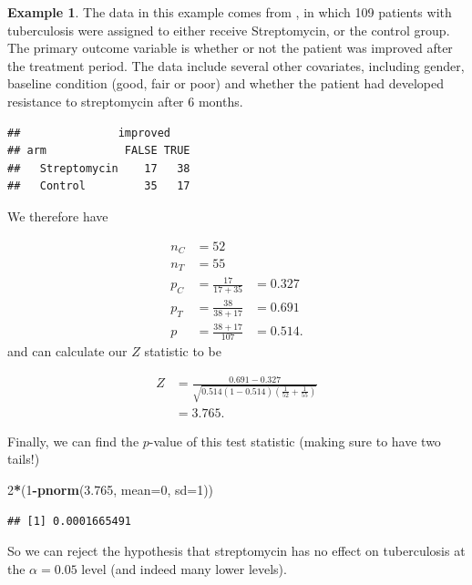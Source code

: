 \documentclass[
  openany]{book}
\newenvironment{Shaded}{\begin{snugshade}}{\end{snugshade}}
\newcommand{\AttributeTok}[1]{\textcolor[rgb]{0.13,0.29,0.53}{#1}}
\newcommand{\DecValTok}[1]{\textcolor[rgb]{0.00,0.00,0.81}{#1}}
\newcommand{\FloatTok}[1]{\textcolor[rgb]{0.00,0.00,0.81}{#1}}
\newcommand{\FunctionTok}[1]{\textcolor[rgb]{0.13,0.29,0.53}{\textbf{#1}}}
\newcommand{\NormalTok}[1]{#1}
\newcommand{\SpecialCharTok}[1]{\textcolor[rgb]{0.81,0.36,0.00}{\textbf{#1}}}
\theoremstyle{definition}
\theoremstyle{definition}
\newtheorem{example}{Example}[chapter]
\theoremstyle{definition}
\theoremstyle{definition}
\theoremstyle{remark}
\begin{document}
\begin{example}
The data in this example comes from \citet{strep_tb}, in which 109 patients with tuberculosis were assigned to either receive Streptomycin, or the control group. The primary outcome variable is whether or not the patient was improved after the treatment period. The data include several other covariates, including gender, baseline condition (good, fair or poor) and whether the patient had developed resistance to streptomycin after 6 months.

\begin{verbatim}
##               improved
## arm            FALSE TRUE
##   Streptomycin    17   38
##   Control         35   17
\end{verbatim}

We therefore have

\[
\begin{aligned}
n_C & = 52 \\
n_T & = 55 \\
p_C & = \frac{17}{17+35} & = 0.327\\
p_T & = \frac{38}{38+17} & = 0.691\\
p & = \frac{38+17}{107} &= 0.514. 
\end{aligned}
\]
and can calculate our \(Z\) statistic to be

\[
\begin{aligned}
Z & = \frac{0.691 - 0.327}{\sqrt{0.514\left(1-0.514\right)\left(\frac{1}{52} + \frac{1}{55}\right)}}\\
& = 3.765.
\end{aligned}
\]

Finally, we can find the \(p\)-value of this test statistic (making sure to have two tails!)

\begin{Shaded}
\begin{Highlighting}[]
\DecValTok{2}\SpecialCharTok{*}\NormalTok{(}\DecValTok{1}\SpecialCharTok{{-}}\FunctionTok{pnorm}\NormalTok{(}\FloatTok{3.765}\NormalTok{, }\AttributeTok{mean=}\DecValTok{0}\NormalTok{, }\AttributeTok{sd=}\DecValTok{1}\NormalTok{))}
\end{Highlighting}
\end{Shaded}

\begin{verbatim}
## [1] 0.0001665491
\end{verbatim}

So we can reject the hypothesis that streptomycin has no effect on tuberculosis at the \(\alpha=0.05\) level (and indeed many lower levels).
\end{example}
\end{document}
